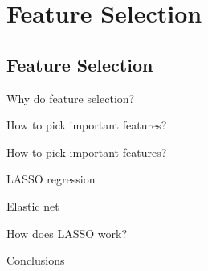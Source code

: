 \section{Feature Selection}
\subsection{Feature Selection}
\begin{frame}[t]{Why do feature selection?}

\end{frame}
\begin{frame}[t]{How to pick important features?}

\end{frame}
\begin{frame}[t]{How to pick important features?}

\end{frame}
\begin{frame}[t]{LASSO regression}

\end{frame}
\begin{frame}[t]{Elastic net}

\end{frame}
\begin{frame}[t]{How does LASSO work?}

\end{frame}
\begin{frame}[t]{Conclusions}

\end{frame}
